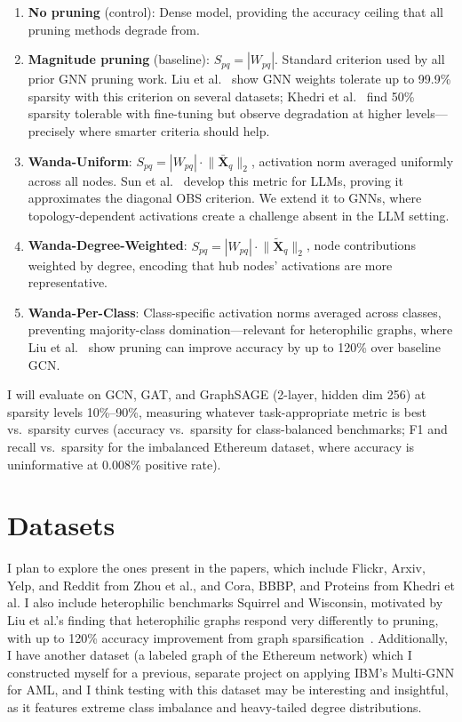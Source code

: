 \documentclass[10pt]{article}
\begin{document}
\begin{enumerate}[label=(\alph*),leftmargin=*,itemsep=1pt,parsep=0pt]
    \item \textbf{No pruning} (control): Dense model, providing the accuracy ceiling that all pruning methods degrade from.
    \item \textbf{Magnitude pruning} (baseline): $S_{pq} = |W_{pq}|$. Standard criterion used by all prior GNN pruning work. Liu et al.~\cite{liu2024cgp} show GNN weights tolerate up to 99.9\% sparsity with this criterion on several datasets; Khedri et al.~\cite{khedri2025} find 50\% sparsity tolerable with fine-tuning but observe degradation at higher levels---precisely where smarter criteria should help.
    \item \textbf{Wanda-Uniform}: $S_{pq} = |W_{pq}| \cdot \lVert \bar{\mathbf{X}}_q \rVert_2$, activation norm averaged uniformly across all nodes. Sun et al.~\cite{sun2024} develop this metric for LLMs, proving it approximates the diagonal OBS criterion. We extend it to GNNs, where topology-dependent activations create a challenge absent in the LLM setting.
    \item \textbf{Wanda-Degree-Weighted}: $S_{pq} = |W_{pq}| \cdot \lVert \tilde{\mathbf{X}}_q \rVert_2$, node contributions weighted by degree, encoding that hub nodes' activations are more representative.
    \item \textbf{Wanda-Per-Class}: Class-specific activation norms averaged across classes, preventing majority-class domination---relevant for heterophilic graphs, where Liu et al.~\cite{liu2024cgp} show pruning can improve accuracy by up to 120\% over baseline GCN.
\end{enumerate}

I will evaluate on GCN, GAT, and GraphSAGE (2-layer, hidden dim 256) at sparsity levels 10\%--90\%, measuring whatever task-appropriate metric is best vs.\ sparsity curves (accuracy vs.\ sparsity for class-balanced benchmarks; F1 and recall vs.\ sparsity for the imbalanced Ethereum dataset, where accuracy is uninformative at 0.008\% positive rate).

\section{Datasets}

I plan to explore the ones present in the papers, which include Flickr, Arxiv, Yelp, and Reddit from Zhou et al., and Cora, BBBP, and Proteins from Khedri et al. I also include heterophilic benchmarks Squirrel and Wisconsin, motivated by Liu et al.'s finding that heterophilic graphs respond very differently to pruning, with up to 120\% accuracy improvement from graph sparsification~\cite{liu2024cgp}. Additionally, I have another dataset (a labeled graph of the Ethereum network) which I constructed myself for a previous, separate project on applying IBM's Multi-GNN for AML, and I think testing with this dataset may be interesting and insightful, as it features extreme class imbalance and heavy-tailed degree distributions.
\end{document}
